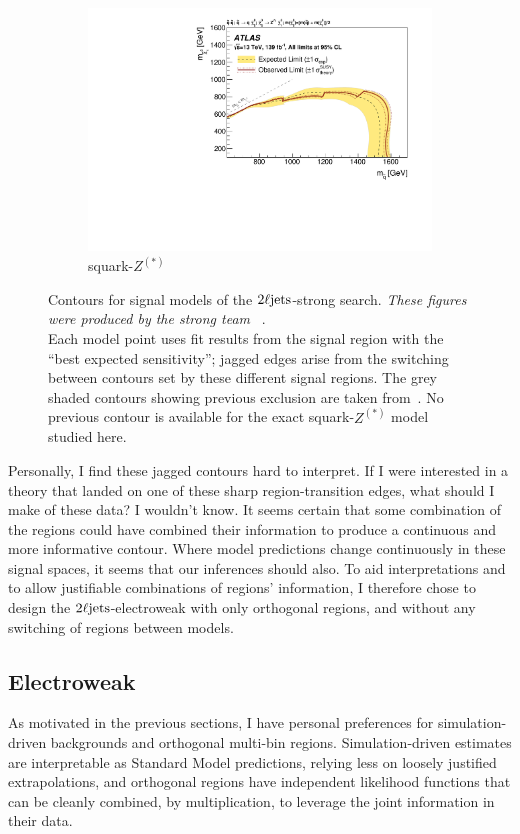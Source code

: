 \begin{figure}[tp]
\begin{subfigure}{0.48\textwidth}
\includegraphics[width=\textwidth]{figures/2ljets_strong_contours_squark_z.pdf}
\caption{squark-$Z^{(*)}$}
\end{subfigure}
\caption[
Contours for signal models of the $\twoljets$-strong search
]{%
Contours for signal models of the $\twoljets$-strong search.
\emph{These figures were produced by the strong team%
}~\cite{atlas2022searches}.
\\[0.5em]
Each model point uses fit results from the signal region with the
``best expected sensitivity'';
jagged edges arise from the switching between contours set by these different
signal regions.
The grey shaded contours showing previous exclusion are taken
from~\cite{atlas_susy_strong_2l_partial_run2}.
No previous contour is available for the exact squark-$Z^{(*)}$ model studied
here.
}
\label{fig:2ljets_strong_contours}
\end{figure}

Personally, I find these jagged contours hard to interpret.
If I were interested in a theory that landed on one of these sharp
region-transition edges, what should I make of these data?
I wouldn't know.
It seems certain that some combination of the regions could have combined their
information to produce a continuous and more informative contour.
Where model predictions change continuously in these signal spaces, it seems
that our inferences should also.
To aid interpretations and to allow justifiable combinations of regions'
information, I therefore chose to design the $\twoljets$-electroweak with only
orthogonal regions, and without any switching of regions between models.


\subsection{Electroweak}
\label{sec:2ljets_origins_electroweak}
As motivated in the previous sections, I have personal preferences for
simulation-driven backgrounds and orthogonal multi-bin regions.
Simulation-driven estimates are interpretable as Standard Model predictions,
relying less on loosely justified extrapolations,
and orthogonal regions have independent likelihood functions that can be
cleanly combined, by multiplication, to leverage the joint information in their
data.

